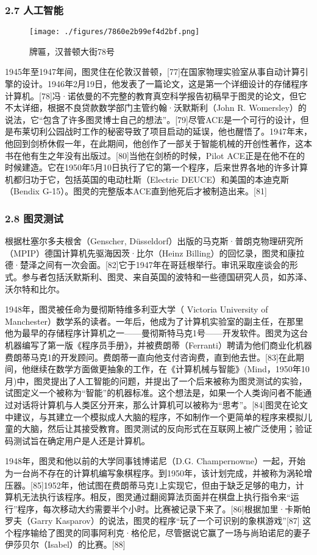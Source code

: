 \subsubsection{2.7 人工智能}
\begin{figure}[ht]
\centering
\texttt{[image: ./figures/7860e2b99ef4d2bf.png]}
\caption{牌匾，汉普顿大街78号} \label{fig_ALTL_5}
\end{figure}
1945年至1947年间，图灵住在伦敦汉普顿，[77]在国家物理实验室从事自动计算引擎的设计。1946年2月19日，他发表了一篇论文，这是第一个详细设计的存储程序计算机。[78]冯·诺依曼的不完整的教育真空科学报告初稿早于图灵的论文，但它不太详细，根据不良贷款数学部门主管约翰·沃默斯利（John R. Womersley）的说法，它“包含了许多图灵博士自己的想法”。[79]尽管ACE是一个可行的设计，但是布莱切利公园战时工作的秘密导致了项目启动的延误，他也醒悟了。1947年末，他回到剑桥休假一年，在此期间，他创作了一部关于智能机械的开创性著作，这本书在他有生之年没有出版过。[80]当他在剑桥的时候，Pilot ACE正是在他不在的时候建造。它在1950年5月10日执行了它的第一个程序，后来世界各地的许多计算机都归功于它，包括英国的电动杜斯（Electric DEUCE）和美国的本迪克斯（Bendix G-15）。图灵的完整版本ACE直到他死后才被制造出来。[81]
\subsubsection{2.8 图灵测试}
根据杜塞尔多夫根舍（Genscher, Düsseldorf）出版的马克斯·普朗克物理研究所（MPIP）德国计算机先驱海因茨·比尔（Heinz Billing）的回忆录，图灵和康拉德·楚泽之间有一次会面。[82]它于1947年在哥廷根举行。审讯采取座谈会的形式。参与者包括沃默斯利、图灵、来自英国的波特和一些德国研究人员，如苏泽、沃尔特和比尔。

1948年，图灵被任命为曼彻斯特维多利亚大学（ Victoria University of Manchester）数学系的读者。一年后，他成为了计算机实验室的副主任，在那里他为最早的存储程序计算机之一——曼彻斯特马克1号——开发软件。图灵为这台机器编写了第一版《程序员手册》，并被费朗蒂（Ferranti）聘请为他们商业化机器费朗蒂马克1的开发顾问。费朗蒂一直向他支付咨询费，直到他去世。[83]在此期间，他继续在数学方面做更抽象的工作，在《计算机械与智能》(Mind，1950年10月)中，图灵提出了人工智能的问题，并提出了一个后来被称为图灵测试的实验，试图定义一个被称为“智能”的机器标准。这个想法是，如果一个人类询问者不能通过对话将计算机与人类区分开来，那么计算机可以被称为“思考”。[84]图灵在论文中建议，与其建立一个模拟成人大脑的程序，不如制作一个更简单的程序来模拟儿童的大脑，然后让其接受教育。图灵测试的反向形式在互联网上被广泛使用；验证码测试旨在确定用户是人还是计算机。

1948年，图灵和他以前的大学同事钱博诺尼（D.G. Champernowne）一起，开始为一台尚不存在的计算机编写象棋程序。到1950年，该计划完成，并被称为涡轮增压器。[85]1952年，他试图在费朗蒂马克1上实现它，但由于缺乏足够的电力，计算机无法执行该程序。相反，图灵通过翻阅算法页面并在棋盘上执行指令来“运行”程序，每次移动大约需要半个小时。比赛被记录下来了。[86]根据加里·卡斯帕罗夫（Garry Kasparov）的说法，图灵的程序“玩了一个可识别的象棋游戏”[87] 这个程序输给了图灵的同事阿利克·格伦尼，尽管据说它赢了一场与尚珀诺尼的妻子伊莎贝尔（Isabel）的比赛。[88]

